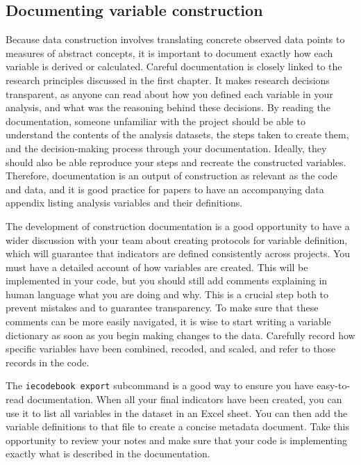 \subsection{Documenting variable construction}

Because data construction involves translating concrete observed data points
to measures of abstract concepts,
it is important to document exactly how each variable is derived or calculated.
Careful documentation is closely linked to the research principles discussed in the first chapter.
It makes research decisions transparent,
as anyone can read about how you defined each variable in your analysis,
and what was the reasoning behind these decisions.
By reading the documentation,
someone unfamiliar with the project should be able to understand the contents of the analysis datasets,
the steps taken to create them, and the decision-making process through your documentation.
Ideally, they should also be able reproduce your steps and recreate the constructed variables.
Therefore, documentation is an output of construction as relevant as the code and data,
and it is good practice for papers to have an accompanying data appendix
listing analysis variables and their definitions.

The development of construction documentation is a good opportunity to have
a wider discussion with your team about creating protocols for variable definition,
which will guarantee that indicators are defined consistently across projects.
You must have a detailed account of how variables are created.
This will be implemented in your code, but you should still
add comments explaining in human language what you are doing and why.
This is a crucial step both to prevent mistakes and to guarantee transparency.
To make sure that these comments can be more easily navigated,
it is wise to start writing a variable dictionary as soon as you begin making changes to the data.
Carefully record how specific variables have been combined, recoded, and scaled,
and refer to those records in the code.

The \texttt{iecodebook export} subcommand is
a good way to ensure you have easy-to-read documentation.
When all your final indicators have been created,
you can use it to list all variables in the dataset in an Excel sheet.
You can then add the variable definitions to that file to create a concise metadata document.
Take this opportunity to review your notes and make sure that your code
is implementing exactly what is described in the documentation.

